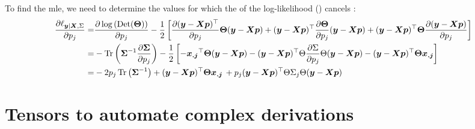 To find the \gls{mle}, we need to determine the values for which the of the log-likelihood () cancels : 
\begin{equation}
\label{eq:derivative-log-likelihood-reference}
\begin{split}
\frac{\partial \ell_{\boldsymbol{y} | \boldsymbol{X}, \Sigma}}{\partial p_j} =& \frac{\partial \log\left(\operatorname*{Det}(\boldsymbol{\Theta})\right)}{\partial p_j} -\frac{1}{2} \left[\frac{\partial (\boldsymbol{y} - \boldsymbol{X} \boldsymbol{p})^\top}{\partial p_j}\boldsymbol{\Theta}(\boldsymbol{y} - \boldsymbol{X} \boldsymbol{p}) + (\boldsymbol{y} - \boldsymbol{X} \boldsymbol{p})^\top\frac{\partial\boldsymbol{\Theta}}{\partial p_j}(\boldsymbol{y} - \boldsymbol{X} \boldsymbol{p}) + (\boldsymbol{y} - \boldsymbol{X} \boldsymbol{p})^\top\boldsymbol{\Theta} \frac{\partial (\boldsymbol{y} - \boldsymbol{X} \boldsymbol{p})}{\partial p_j} \right]\\
=&-\operatorname*{Tr} \left(\boldsymbol{\Sigma}^{-1} \frac{\partial \boldsymbol{\Sigma}}{\partial p_j} \right) - \frac{1}{2} \left[ - \boldsymbol{x_{.j}}^\top\boldsymbol{\Theta}(\boldsymbol{y} - \boldsymbol{X} \boldsymbol{p}) - (\boldsymbol{y} - \boldsymbol{X} \boldsymbol{p})^\top\Theta\frac{\partial \Sigma}{\partial p_j}\Theta(\boldsymbol{y} - \boldsymbol{X} \boldsymbol{p}) - (\boldsymbol{y} - \boldsymbol{X} \boldsymbol{p})^\top\boldsymbol{\Theta}  \boldsymbol{x_{.j}} \right] \\
=& -2p_j \operatorname*{Tr} \left(\boldsymbol{\Sigma}^{-1}\right) + (\boldsymbol{y} - \boldsymbol{X} \boldsymbol{p})^\top\boldsymbol{\Theta}  \boldsymbol{x_{.j}} \, + p_j (\boldsymbol{y} - \boldsymbol{X} \boldsymbol{p})^\top\Theta \Sigma_j \Theta (\boldsymbol{y} - \boldsymbol{X} \boldsymbol{p})
\end{split}
\end{equation}


\section{Tensors to automate complex derivations}